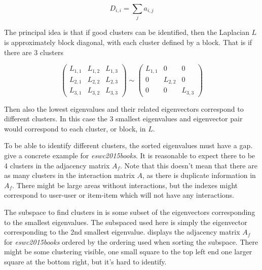 \begin{equation}
    D_{i, i} = \sum_j a_{i, j}
\end{equation}

The principal idea is that if good clusters can be identified, then the Laplacian $L$ is approximately block diagonal, with each cluster defined by a block. That is if there are 3 clusters

\begin{equation}
    \begin{pmatrix}
        L_{1, 1} & L_{1, 2} & L_{1, 3} \\
        L_{2, 1} & L_{2, 2} & L_{2, 3} \\
        L_{3, 1} & L_{3, 2} & L_{3, 3}
    \end{pmatrix}
    \sim
    \begin{pmatrix}
        L_{1, 1} & 0         & 0        \\
        0        & L_{2, 2}  & 0        \\
        0        & 0         & L_{3, 3}
    \end{pmatrix}
\end{equation}

Then also the lowest eigenvalues and their related eigenvectors correspond to different clusters. In this case the 3 smallest eigenvalues and eigenvector pair would correspond to each cluster, or block, in $L$.

To be able to identify different clusters, the sorted eigenvalues must have a gap.  give a concrete example for \textit{eswc2015books}. It is reasonable to expect there to be 4 clusters in the adjacency matrix $A_f$. Note that this doesn't mean that there are as many clusters in the interaction matrix $A$, as there is duplicate information in $A_f$. There might be large areas without interactions, but the indexes might correspond to user-user or item-item which will not have any interactions.

The subspace to find clusters in is some subset of the eigenvectors corresponding to the smallest eigenvalues. The subspaced used here is simply the eigenvector corresponding to the 2nd smallest eigenvalue.  displays the adjacency matrix $A_f$ for \textit{eswc2015books} ordered by the ordering used when sorting the subspace. There might be some clustering visible, one small square to the top left end one larger square at the bottom right, but it's hard to identify.

\FloatBarrier

